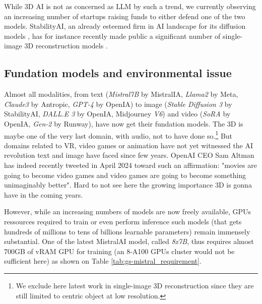 While 3D \ac{AI} is not as concerned as \ac{LLM} by such a trend, we currently observing an increasing number of startups raising funds to either defend one of the two models. StabilityAI, an already esteemed firm in \ac{AI} landscape for its diffusion models \citep{esser2024scaling}, has for instance recently made public a significant number of single-image 3D reconstruction models \citep{tochilkin2024triposr,voleti2024sv3d}. 

\subsection{Fundation models and environmental issue}

Almost all modalities, from text (\textit{Mistral7B} by MistralIA, \textit{Llama2} by Meta, \textit{Claude3} by Antropic, \textit{GPT-4} by OpenIA) to image (\textit{Stable Diffusion 3} by StabilityAI, \textit{DALL.E 3} by OpenIA, Midjourney \textit{V6}) and video (\textit{SoRA} by OpenIA, \textit{Gen-2} by Runway), have now get their fundation models. The 3D is maybe one of the very last domain, with audio, not to have done so.\footnote{We exclude here latest work in single-image 3D reconstruction since they are still limited to centric object at low resolution.} But domains related to \ac{VR}, video games or animation have not yet witnessed the \ac{AI} revolution text and image have faced since few years. OpenAI CEO Sam Altman has indeed recently tweeted in April 2024 toward such an affirmation: "movies are going to become video games and video games are going to become something unimaginably better". Hard to not see here the growing importance 3D is gonna have in the coming years. 

However, while an increasing numbers of models are now freely available, \ac{GPU}s ressources required to train or even perform inference such models (that gets hundreds of millions to tens of billions learnable parameters) remain immensely substantial. One of the latest MistralAI model, called \textit{8x7B}, thus requires almost 700GB of vRAM \ac{GPU} for training (an 8-A100 \ac{GPU}s cluster would not be sufficient here) as shown on Table \ref{tab:gs-mistral_requirement}. 

